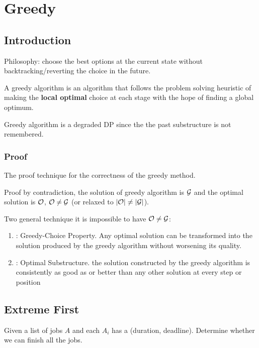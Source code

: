 \chapter{Greedy}

\section{Introduction}
Philosophy: choose the best options at the current state without backtracking/reverting the choice in the future. 

A greedy algorithm is an algorithm that follows the problem solving heuristic of making the \textbf{local optimal} choice at each stage with the hope of finding a global optimum.

Greedy algorithm is a degraded DP since the the past substructure is not remembered.

\subsection{Proof}
The proof technique for the correctness of the greedy method. 

Proof by contradiction, the solution of greedy algorithm is $\mathcal{G}$ and the optimal solution is $\mathcal{O}$, $\mathcal{O}\neq \mathcal{G}$ (or relaxed to $|\mathcal{O}|\neq |\mathcal{G}|$). 

Two general technique it is impossible to have $\mathcal{O}\neq \mathcal{G}$:
\begin{enumerate}
\item {}: Greedy-Choice Property. Any optimal solution can be transformed into the solution produced by the greedy algorithm without worsening its quality.  
\item {}: Optimal Substructure. the solution constructed by the greedy algorithm is consistently as good as or better than any other solution at every step or position
\end{enumerate}

\section{Extreme First}
 Given a list of jobs $A$ and each $A_i$ has a (duration, deadline). Determine whether we can finish all the jobs. 

